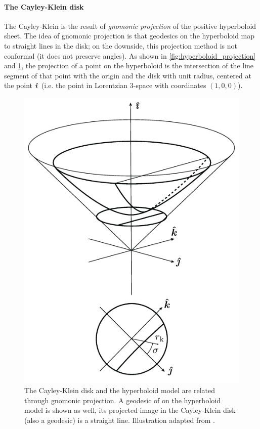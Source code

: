 \paragraph{The Cayley-Klein disk} The Cayley-Klein is the result of \emph{gnomonic projection} of the positive hyperboloid sheet. The idea of gnomonic projection is that geodesics on the hyperboloid map to straight lines in the disk; on the downside, this projection method is not conformal (it does not preserve angles). As shown in \cref{fig:hyperboloid_projection} and \cref{fig:cayley_disk}, the projection of a point on the hyperboloid is the intersection of the line segment of that point with the origin and the disk with unit radius, centered at the point $\quati$ (i.e. the point in Lorentzian 3-space with coordinates $(1, 0, 0)$). 
\begin{figure}[ht!]
    \centering
    \includegraphics[scale=1]{media/other/cayley_disk-eps-converted-to}
    \caption{The Cayley-Klein disk and the hyperboloid model are related through gnomonic projection. A geodesic of on the hyperboloid model is shown as well, its projected image in the Cayley-Klein disk (also a geodesic) is a straight line. Illustration adapted from \citet{Balazs1986}.}
    \label{fig:cayley_disk}
\end{figure}

